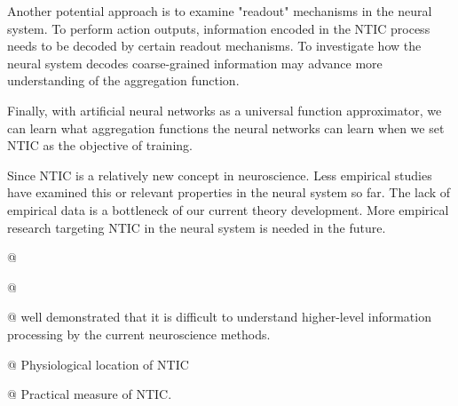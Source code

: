 \documentclass[utf8]{article}
\begin{document}
        Another potential approach is to examine "readout" mechanisms in the neural system. To perform action outputs, information encoded in the NTIC process needs to be decoded by certain readout mechanisms. To investigate how the neural system decodes coarse-grained information may advance more understanding of the aggregation function. 
        
        Finally, with artificial neural networks as a universal function approximator, we can learn what aggregation functions the neural networks can learn when we set NTIC as the objective of training. 
        
        Since NTIC is a relatively new concept in neuroscience. Less empirical studies have examined this or relevant properties in the neural system so far. The lack of empirical data is a bottleneck of our current theory development. More empirical research targeting NTIC in the neural system is needed in the future. 
		
        \begin{WritingMaterials}
			@  \cite{price2007causation}

			@  \cite{price2007causation}

			@ \cite{jonas2017could} well demonstrated that it is difficult to understand higher-level information processing by the current neuroscience methods.
        
			
			@ Physiological location of NTIC
			
			@ Practical measure of NTIC. 
        
		\end{WritingMaterials}		




\end{document}
